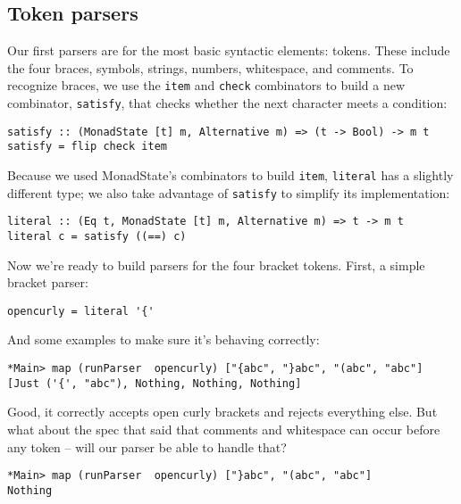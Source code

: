 \documentclass{tmr}
\begin{document}
\subsection{Token parsers}
Our first parsers are for the most basic syntactic elements:  tokens.
These include the four braces, symbols, strings, numbers, whitespace, and comments.
To recognize braces, we use the \verb+item+ and \verb+check+ 
combinators to build a new combinator, \verb+satisfy+, that checks whether 
the next character meets a condition:
\begin{verbatim}
satisfy :: (MonadState [t] m, Alternative m) => (t -> Bool) -> m t
satisfy = flip check item
\end{verbatim}

Because we used MonadState's combinators to build \verb+item+, \verb+literal+ 
has a slightly different type; we also take advantage of \verb+satisfy+ to 
simplify its implementation:
\begin{verbatim}
literal :: (Eq t, MonadState [t] m, Alternative m) => t -> m t
literal c = satisfy ((==) c)
\end{verbatim}

Now we're ready to build parsers for the four bracket tokens.  
First, a simple bracket parser:
\begin{verbatim}
opencurly = literal '{'
\end{verbatim}

And some examples to make sure it's behaving correctly: 
\begin{verbatim}
*Main> map (runParser  opencurly) ["{abc", "}abc", "(abc", "abc"]
[Just ('{', "abc"), Nothing, Nothing, Nothing]
\end{verbatim}

Good, it correctly accepts open curly brackets and rejects everything else.
But what about the spec that said that comments and whitespace can occur 
before any token -- will our parser be able to handle that?
\begin{verbatim}
*Main> map (runParser  opencurly) ["}abc", "(abc", "abc"]
Nothing
\end{verbatim}
\end{document}
